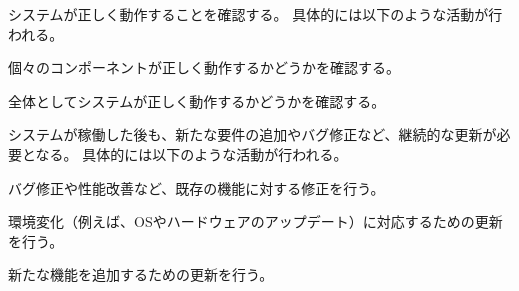 システムが正しく動作することを確認する。
具体的には以下のような活動が行われる。



個々のコンポーネントが正しく動作するかどうかを確認する。



全体としてシステムが正しく動作するかどうかを確認する。




システムが稼働した後も、新たな要件の追加やバグ修正など、継続的な更新が必要となる。
具体的には以下のような活動が行われる。



バグ修正や性能改善など、既存の機能に対する修正を行う。



環境変化（例えば、OSやハードウェアのアップデート）に対応するための更新を行う。



新たな機能を追加するための更新を行う。




